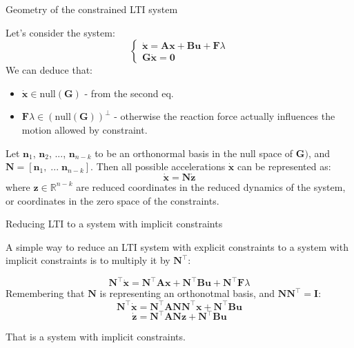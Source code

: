 \documentclass{beamer}
\begin{document}
\begin{frame}{Geometry of the constrained LTI system}
\begin{flushleft}

Let's consider the system:
%
\[
\begin{cases}
\dot {\mathbf x} = \mathbf A \mathbf x + 
\mathbf B \mathbf u + \mathbf F \lambda \\
\mathbf G \dot {\mathbf x} = \mathbf 0
\end{cases}
\]
%
We can deduce that:
\begin{itemize}
    \item $\dot {\mathbf x} \in \text{null}(\mathbf G)$ - from the second eq.
    \item $\mathbf F \lambda \in (\text{null}(\mathbf G))^\perp$ - otherwise the reaction force actually influences the motion allowed by constraint.
\end{itemize}

Let $\mathbf n_1$, $\mathbf n_2$, ..., $\mathbf n_{n-k}$ to be an orthonormal basis in the null space of $\mathbf G)$, and $\mathbf N = [\mathbf n_1, \; ... \; \mathbf n_{n-k}]$. Then all possible accelerations $\dot {\mathbf x}$ can be represented as:
%
\[
\dot {\mathbf x} = \mathbf N \dot{\mathbf z}
\]
where $\mathbf z \in \mathbb{R}^{n-k}$ are reduced coordinates in the reduced dynamics of the system, or coordinates in the zero space of the constraints.


\end{flushleft}
\end{frame}


\begin{frame}{Reducing LTI to a system with implicit constraints}
\begin{flushleft}

A simple way to reduce an LTI system with explicit constraints to a system with implicit constraints is to multiply it by $\mathbf N^\top$:

%
\[
\mathbf N^\top \dot {\mathbf x} = \mathbf N^\top \mathbf A \mathbf x + 
\mathbf N^\top \mathbf B \mathbf u + \mathbf N^\top \mathbf F \lambda
\]
%
Remembering that $\mathbf N$ is representing an orthonotmal basis, and $\mathbf N \mathbf N^\top = \mathbf I$:
\[
\mathbf N^\top \dot {\mathbf x} = \mathbf N^\top \mathbf A \mathbf N \mathbf N^\top \mathbf x + 
\mathbf N^\top \mathbf B \mathbf u
\]
\[
\dot {\mathbf z} = \mathbf N^\top \mathbf A \mathbf N \mathbf z + 
\mathbf N^\top \mathbf B \mathbf u
\]

That is a system with implicit constraints.


\end{flushleft}
\end{frame}
\end{document}
